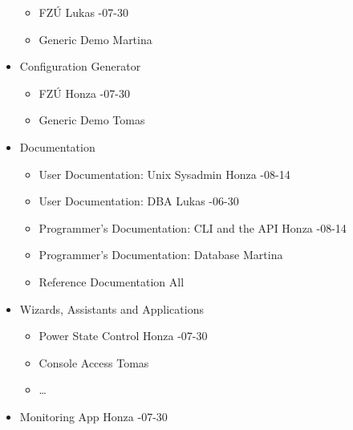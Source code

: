 \documentclass{article}
\begin{document}
\begin{itemize}
\begin{itemize}
            \item FZÚ \tab Lukas -07-30
            \item Generic Demo \tab Martina
        \end{itemize}
    \item Configuration Generator
        \begin{itemize}
            \item FZÚ \tab Honza -07-30
            \item Generic Demo \tab Tomas
        \end{itemize}
    \item Documentation
        \begin{itemize}
            \item User Documentation: Unix Sysadmin \tab Honza -08-14
            \item User Documentation: DBA \tab Lukas -06-30
            \item Programmer's Documentation: CLI and the API \tab Honza -08-14
            \item Programmer's Documentation: Database \tab Martina
            \item Reference Documentation \tab All
        \end{itemize}
    \item Wizards, Assistants and Applications
        \begin{itemize}
            \item Power State Control \tab Honza -07-30
            \item Console Access \tab Tomas
            \item \ldots
        \end{itemize}
    \item Monitoring App \tab Honza -07-30
\end{itemize}
\end{document}
